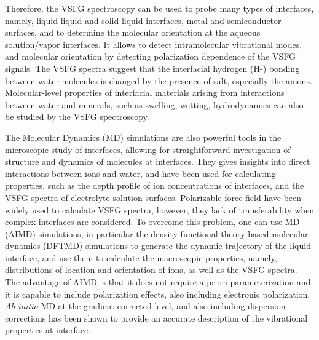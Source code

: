 Therefore, the VSFG spectroscopy can be used to probe many types of interfaces, namely, liquid-liquid and 
solid-liquid interfaces\cite{Guyot-Sionnest1987,RS91,DuQ1993,DuQ1994,Richmond2002,Gopalakrishnan2006,ShenYR2006,Morita2008}, metal and semiconductor surfaces\cite{Harris87,Superfine88},
and to determine the molecular orientation at the aqueous solution/vapor interfaces.
It allows to detect intramolecular vibrational modes, and molecular orientation by detecting polarization dependence of the VSFG signals\cite{Vidal05}.  
The VSFG spectra suggest that the interfacial hydrogen (H-) bonding between water molecules is changed by the presence of salt, 
especially the anions\cite{Raymond2004}.
Molecular-level properties of interfacial materials arising from interactions between water and minerals, 
such as swelling, wetting, hydrodynamics can also be studied by the VSFG spectroscopy\cite{Rotenberg14}.

The Molecular Dynamics (MD) simulations are also powerful tools in the microscopic study of interfaces,
allowing for straightforward investigation of structure and dynamics of molecules at interfaces\cite{Morita2008}.
They gives insights into direct interactions between ions and water, and have been used for calculating properties, 
such as the depth profile of ion concentrations of interfaces\cite{Jungwirth2001,Jungwirth2002}, and the VSFG spectra 
of electrolyte solution surfaces\cite{Gopalakrishnan2006,Johnson2014,Ishiyama2014,Ishiyama2017}.
Polarizable force field have been widely used to calculate VSFG spectra\cite{LXD03,Petersen2004,TI07,MM05}, however, they lack
of transferability when complex interfaces are considered.
To overcome this problem, one can use \abinitio MD (AIMD) simulations\cite{CP1985,Pastore1991,Hutter2012}, 
in particular the density functional theory-based molecular dynamics (DFTMD) simulations\cite{CP1985,Nagata2015,Nagata2016,Kuehne2020} to generate the dynamic trajectory of 
the liquid interface, and use them to calculate the macroscopic properties, namely, distributions of location and
orientation of ions, as well as the VSFG spectra\cite{Sulpizi2013,Usui2015,Ohto2015,Khatib2016}.  
The advantage of AIMD is that it does not require a priori parameterization and it is capable to include polarization effects\cite{Ufimtsev2011},
also including electronic polarization. \emph{Ab initio} MD at the gradient corrected level, and also including dispersion corrections\cite{Grimme2004,Grimme2006,Grimme2007,Grimme2010,Baer2011}
has been shown to provide an accurate description of the vibrational properties at interface\cite{Fornaro2015}.

